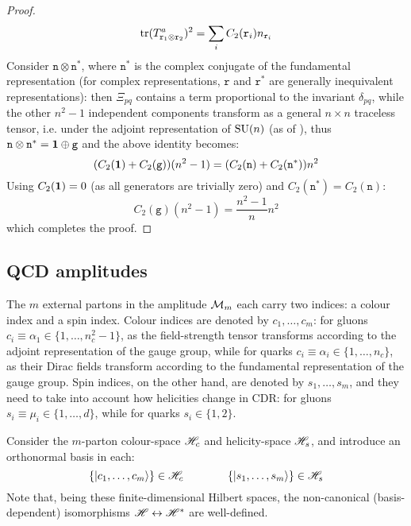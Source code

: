 \begin{proofbox}
\begin{proof}
    \begin{equation*}
      \operatorname{tr} (T^a_{\mathtt{r}_1 \otimes \mathtt{r}_2})^2 = \sum_i C_2(\mathtt{r}_i) n_{\mathtt{r}_i}
    \end{equation*}
    Consider $ \mathtt{n} \otimes \mathtt{n}^* $, where $ \mathtt{n}^* $ is the complex conjugate of the fundamental representation (for complex representations, $ \mathtt{r} $ and $ \mathtt{r}^* $ are generally inequivalent representations): then $ \Xi_{pq} $ contains a term proportional to the invariant $ \delta_{pq} $, while the other $ n^2 - 1 $  independent components transform as a general $ n \times n $ traceless tensor, i.e. under the adjoint representation of $ \mathrm{SU}(n) $ (as of ), thus $ \mathtt{n} \otimes \mathtt{n}^* = \mathbf{1} \oplus \mathtt{g} $ and the above identity becomes:
    \begin{equation*}
      (C_2(\mathbf{1}) + C_2(\mathtt{g})) (n^2 - 1) = (C_2(\mathtt{n}) + C_2(\mathtt{n}^*)) n^2
    \end{equation*}
    Using $ C_2(\mathbf{1}) = 0 $ (as all generators are trivially zero) and $ C_2(\mathtt{n}^*) = C_2(\mathtt{n}) $:
    \begin{equation*}
      C_2(\mathtt{g}) (n^2 - 1) = \frac{n^2 - 1}{n} n^2
    \end{equation*}
    which completes the proof.
  \end{proof}
\end{proofbox}

\subsection{QCD amplitudes}

The $ m $ external partons in the amplitude $ \mathcal{M}_m $ each carry two indices: a colour index and a spin index. Colour indices are denoted by $ c_1, \dots, c_m $: for gluons $ c_i \equiv \alpha_1 \in \{1, \dots, n_c^2 - 1\} $, as the field-strength tensor  transforms according to the adjoint representation of the gauge group, while for quarks $ c_i \equiv \alpha_i \in \{1, \dots, n_c\} $, as their Dirac fields transform according to the fundamental representation of the gauge group. Spin indices, on the other hand, are denoted by $ s_1, \dots, s_m $, and they need to take into account how helicities change in CDR: for gluons $ s_i \equiv \mu_i \in \{1, \dots, d\} $, while for quarks $ s_i \in \{1,2\} $.

Consider the $ m $-parton colour-space $ \mathscr{H}_c $ and helicity-space $ \mathscr{H}_s $, and introduce an orthonormal basis in each:
\begin{equation*}
  \{\ket{c_1, \dots, c_m}\} \in \mathscr{H}_c
  \qquad \qquad
  \{\ket{s_1, \dots, s_m}\} \in \mathscr{H}_s
\end{equation*}
Note that, being these finite-dimensional Hilbert spaces, the non-canonical (basis-dependent) isomorphisms $ \mathscr{H} \leftrightarrow \mathscr{H}^* $ are well-defined\footnotemark. 

